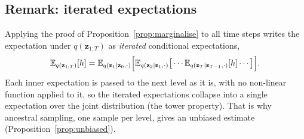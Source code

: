 \subsection*{Remark: iterated expectations}

Applying the proof of Proposition~\ref{prop:marginalise} to all time
steps writes the expectation under $q(\mathbf{z}_{1:T})$ as
\emph{iterated} conditional expectations,
\begin{equation*}
    \mathbb{E}_{q(\mathbf{z}_{1:T})}[h] =
    \mathbb{E}_{q(\mathbf{z}_1 \mid \mathbf{z}_0, \cdot)}\Big[
    \mathbb{E}_{q(\mathbf{z}_2 \mid \mathbf{z}_1, \cdot)}\big[ \cdots
    \mathbb{E}_{q(\mathbf{z}_T \mid \mathbf{z}_{T-1}, \cdot)}[h] \cdots \big]
    \Big].
\end{equation*}
Each inner expectation is passed to the next level as it is, with no
non-linear function applied to it, so the iterated expectations collapse
into a single expectation over the joint distribution (the tower
property). That is why ancestral sampling, one sample per level, gives
an unbiased estimate (Proposition~\ref{prop:unbiased}).

